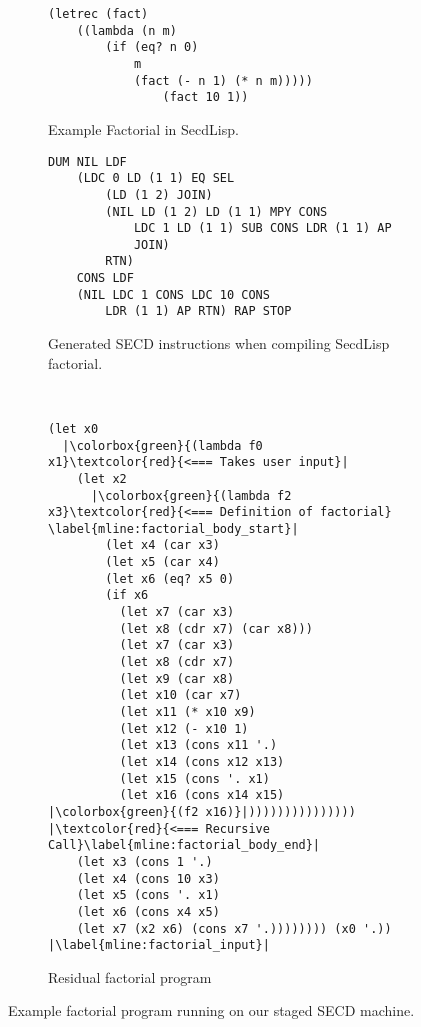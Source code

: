 \documentclass[a4paper,12pt,twoside,openright]{report}
\theoremstyle{definition}
\newcommand{\secdlisp}{SecdLisp}
\begin{document}
\begin{figure}[htp!]
\centering
    \begin{subfigure}{.5\linewidth}
         \centering
         \begin{verbatim}
(letrec (fact)
    ((lambda (n m)
        (if (eq? n 0)
            m
            (fact (- n 1) (* n m)))))
                (fact 10 1))
         \end{verbatim}
         \caption{Example Factorial in \secdlisp.}
         \label{lst:secd_fac_lisp}
    \end{subfigure}%
    \begin{subfigure}{.5\linewidth}
         \centering
         \begin{verbatim}
DUM NIL LDF
    (LDC 0 LD (1 1) EQ SEL
        (LD (1 2) JOIN)
        (NIL LD (1 2) LD (1 1) MPY CONS
            LDC 1 LD (1 1) SUB CONS LDR (1 1) AP
            JOIN)
        RTN)
    CONS LDF
    (NIL LDC 1 CONS LDC 10 CONS
        LDR (1 1) AP RTN) RAP STOP
         \end{verbatim}
    \caption{Generated SECD instructions when compiling \secdlisp{} factorial.}
    \label{lst:secd_fac_ops}
    \end{subfigure}\\[1ex]
    \par\bigskip
    \begin{subfigure}{\linewidth}
        \centering
        \begin{verbatim}
(let x0
  |\colorbox{green}{(lambda f0 x1}\textcolor{red}{<=== Takes user input}|
    (let x2
      |\colorbox{green}{(lambda f2 x3}\textcolor{red}{<=== Definition of factorial} \label{mline:factorial_body_start}|
        (let x4 (car x3)
        (let x5 (car x4)
        (let x6 (eq? x5 0)
        (if x6
          (let x7 (car x3)
          (let x8 (cdr x7) (car x8)))
          (let x7 (car x3)
          (let x8 (cdr x7)
          (let x9 (car x8)
          (let x10 (car x7)
          (let x11 (* x10 x9)
          (let x12 (- x10 1)
          (let x13 (cons x11 '.)
          (let x14 (cons x12 x13)
          (let x15 (cons '. x1)
          (let x16 (cons x14 x15) |\colorbox{green}{(f2 x16)}|))))))))))))))) |\textcolor{red}{<=== Recursive Call}\label{mline:factorial_body_end}|
    (let x3 (cons 1 '.)
    (let x4 (cons 10 x3)
    (let x5 (cons '. x1)
    (let x6 (cons x4 x5)
    (let x7 (x2 x6) (cons x7 '.)))))))) (x0 '.)) |\label{mline:factorial_input}|
        \end{verbatim}
        \caption{Residual factorial program}
        \label{lst:secd_fac_ped}
    \end{subfigure}
\caption{Example factorial program running on our staged SECD machine.}
\label{lst:secd_fac_all}
\end{figure}
\end{document}
